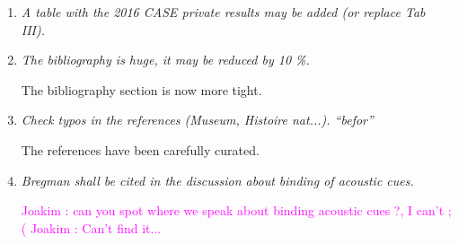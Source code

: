 \documentclass[10pt]{article}
\newcommand{\ja}[1]{\textcolor{magenta}{Joakim : #1}}
\begin{document}
\begin{enumerate}
\item \emph{A table with the 2016 CASE private results may be added (or replace Tab III).}

\item \emph{The bibliography is huge, it may be reduced by 10 \%.}

The bibliography section is now more tight. 

\item \emph{Check typos in the references (Museum, Histoire nat...). “befor”}

The references have been carefully curated.

\item \emph{Bregman shall be cited in the discussion about  binding of acoustic cues.}

\ja{can you spot where we speak about binding acoustic cues ?, I can't ;(}
\ja{Can't find it...}

\end{enumerate}
\end{document}
